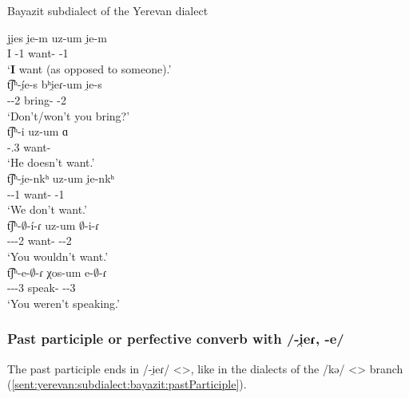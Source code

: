 \begin{exe}
	\ex Bayazit subdialect of the Yerevan dialect \label{sent:yerevan:subdialect:bayazit:auxRep}
	\begin{xlist}
		\ex \gll ji̯es i̯e-m uz-um i̯e-m \\
		I {\aux}-1{\sg} want-{\impfcvb} {\aux}-1{\sg} \\
		\trans `\textbf{I} want (as opposed to someone).'\\
		\ex \gll t͡ʃʰ-\'i̯e-s bʰi̯eɾ-um i̯e-s \\
		{\neggloss}-{\aux}-2{\sg} bring-{\impfcvb} {\aux}-2{\sg} \\
		\trans `Don't/won't you bring?' \\
		\ex \gll t͡ʃʰ-i uz-um ɑ \\
		{\neggloss}-{\aux}.3{\sg} want-{\impfcvb} {\aux} \\
		\trans `He doesn't want.' \\
		\ex \gll t͡ʃʰ-i̯e-nkʰ uz-um i̯e-nkʰ \\
		{\neggloss}-{\aux}-1{\pl} want-{\impfcvb} {\aux}-1{\pl} \\
		\trans `We don't want.' \\
		\ex \gll t͡ʃʰ-$\emptyset$-\'i-ɾ uz-um $\emptyset$-i-ɾ \\
		{\neggloss}-{\aux}-{\pst}-2{\sg} want-{\impfcvb} {\aux}-{\pst}-2{\sg} \\
		\trans `You wouldn't want.' \\
		\ex \gll t͡ʃʰ-e-$\emptyset$-ɾ χos-um e-$\emptyset$-ɾ\\
		{\neggloss}-{\aux}-{\pst}-3{\sg} speak-{\impfcvb} {\aux}-{\pst}-3{\sg} \\
		\trans `You weren't speaking.' \\
	\end{xlist}
\end{exe}


\subsubsection{Past participle or perfective converb with /-i̯eɾ, -e/} 

The past participle ends in /-i̯eɾ/ <>, like in the dialects of the /kə/ <> branch (\ref{sent:yerevan:subdialect:bayazit:pastParticiple}).

